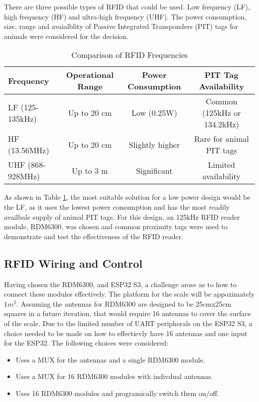 \documentclass[class=report,11pt,crop=false]{standalone}
\begin{document}
There are three possible types of RFID that could be used. Low frequency (LF), high frequency (HF) and ultra-high frequency (UHF). The power consumption, size, range and avaialblity of Passive Integrated Transponders (PIT) tags for animals were considered for the decision. 

\begin{table}[htbp]
    \centering
    {\begin{tabular}{|l|c|c|c|}
        \hline
        \textbf{Frequency} & \textbf{Operational Range} & \textbf{Power Consumption} & \textbf{PIT Tag Availability} \\
        \hline
        LF (125-135kHz) & Up to 20 cm & Low (0.25W) & Common (125kHz or 134.2kHz) \\
        HF (13.56MHz) & Up to 20 cm & Slightly higher & Rare for animal PIT tags \\
        UHF (868-928MHz) & Up to 3 m & Significant & Limited availability \\
        \hline
    \end{tabular}}
    \caption{Comparison of RFID Frequencies \cite{RFID}}
    \label{tab:rfid_comparison}
\end{table}

As shown in Table \ref{tab:rfid_comparison}, the most suitable solution for a low power design would be the LF, as it uses the lowest power consumption and has the most readily availbale supply of animal PIT tags. For this design, an 125kHz RFID reader module, RDM6300, was chosen and common proximity tags were used to demonstrate and test the effectiveness of the RFID reader. 

\subsection*{RFID Wiring and Control}

Having chosen the RDM6300, and ESP32 S3, a challenge arose as to how to connect these modules effectively. The platform for the scale will be appoximately $1m^2$. Assuming the antennas for RDM6300 are designed to be 25cmx25cm squares in a future iteration, that would require 16 antennas to cover the surface of the scale. Due to the limited number of UART peripherals on the ESP32 S3, a choice needed to be made on how to effectievly have 16 antennas and one input for the ESP32. The following choices were considered:

\begin{itemize}
    \item Uses a MUX for the antennas and a single RDM6300 module.
    \item Uses a MUX for 16 RDM6300 modules with indivdual antennas.
    \item Uses 16 RDM6300 modules and programically switch them on/off.
\end{itemize}
\end{document}
